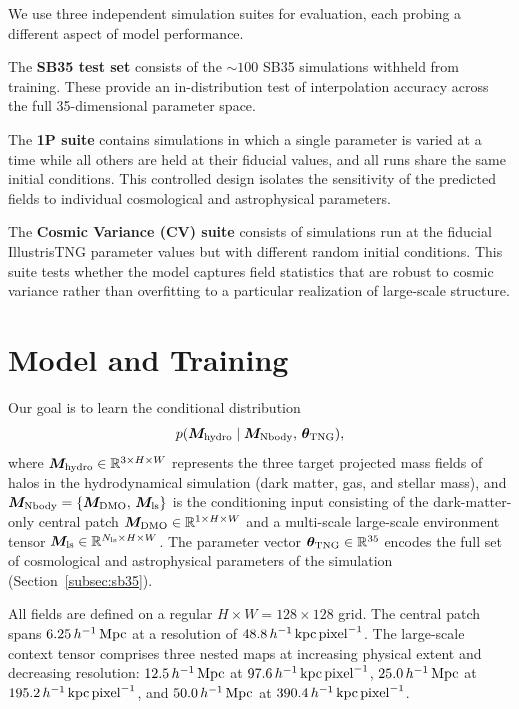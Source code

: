 \documentclass[linenumbers,trackchanges, twocolumn]{aastex701}
\begin{document}
We use three independent simulation suites for evaluation, each
probing a different aspect of model performance.

The \textbf{SB35 test set} consists of the ${\sim}100$ SB35 simulations
withheld from training. These provide an in-distribution test of
interpolation accuracy across the full 35-dimensional parameter space.

The \textbf{1P suite} contains simulations in which a single parameter
is varied at a time while all others are held at their fiducial values,
and all runs share the same initial conditions. This controlled design
isolates the sensitivity of the predicted fields to individual
cosmological and astrophysical parameters.

The \textbf{Cosmic Variance (CV) suite} consists of simulations run at
the fiducial IllustrisTNG parameter values but with different random
initial conditions. This suite tests whether the model captures field
statistics that are robust to cosmic variance rather than overfitting
to a particular realization of large-scale structure.


\section{Model and Training}
\label{sec:model}

Our goal is to learn the conditional distribution
\begin{equation}
    p(\bm{M}_{\rm hydro} \mid \bm{M}_{\rm Nbody},\,
    \boldsymbol{\theta}_{\rm TNG}),
    \label{eq:target_distribution}
\end{equation}
where $\bm{M}_{\rm hydro} \in \mathbb{R}^{3 \times H \times W}$
represents the three target projected mass fields of halos in the
hydrodynamical simulation (dark matter, gas, and stellar mass), and
$\bm{M}_{\rm Nbody} = \{\bm{M}_{\rm DMO},\,\bm{M}_{\rm ls}\}$ is
the conditioning input consisting of the dark-matter-only central patch
$\bm{M}_{\rm DMO} \in \mathbb{R}^{1 \times H \times W}$ and a
multi-scale large-scale environment tensor
$\bm{M}_{\rm ls} \in \mathbb{R}^{N_{\rm ls} \times H \times W}$. The
parameter vector $\boldsymbol{\theta}_{\rm TNG} \in \mathbb{R}^{35}$
encodes the full set of cosmological and astrophysical parameters of
the simulation (Section~\ref{subsec:sb35}).

All fields are defined on a regular $H \times W = 128 \times 128$ grid.
The central patch spans $6.25\,h^{-1}\,{\rm Mpc}$ at a resolution of
$48.8\,h^{-1}\,{\rm kpc\,pixel}^{-1}$. The large-scale context
tensor comprises three nested maps at increasing physical extent
and decreasing resolution: $12.5\,h^{-1}\,{\rm Mpc}$ at
$97.6\,h^{-1}\,{\rm kpc\,pixel}^{-1}$,
$25.0\,h^{-1}\,{\rm Mpc}$ at $195.2\,h^{-1}\,{\rm kpc\,pixel}^{-1}$,
and $50.0\,h^{-1}\,{\rm Mpc}$ at $390.4\,h^{-1}\,{\rm kpc\,pixel}^{-1}$.
\end{document}
